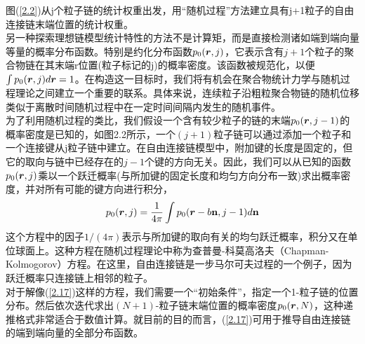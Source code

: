 图(\ref{2.2})从j个粒子链的统计权重出发，用“随机过程”方法建立具有j+1粒子的自由连接链末端位置的统计权重。\\

另一种探索理想链模型统计特性的方法不是计算矩，而是直接检测诸如端到端向量等量的概率分布函数。特别是约化分布函数$p_{0}(\bm{r},j)$，它表示含有$j+1$个粒子的聚合物链在其末端r位置(粒子标记的j)的概率密度。该函数被规范化，以便$\int p_0(\bm{r},j)d\bm{r}=1$。在构造这一目标时，我们将有机会在聚合物统计力学与随机过程理论之间建立一个重要的联系。具体来说，连续粒子沿粗粒聚合物链的随机位移类似于离散时间随机过程中在一定时间间隔内发生的随机事件。\\

为了利用随机过程的类比，我们假设一个含有较少粒子的链的末端$p_{0}(\bm{r},j-1)$的概率密度是已知的，如图2.2所示，一个$(j+1)$粒子链可以通过添加一个粒子和一个连接键从j粒子链中建立。在自由连接链模型中，附加键的长度是固定的，但它的取向与链中已经存在的$j−1$个键的方向无关。因此，我们可以从已知的函数$p_{0}(\bm{r},j)$乘以一个跃迁概率(与所加键的固定长度和均匀方向分布一致)求出概率密度，并对所有可能的键方向进行积分，\\
\begin{gather}
p_{0}(\bm{r},j)=\frac{1}{4 \pi} \int p_0(\bm{r}-b \mathbf{n},j-1)d\mathbf{n}
\label{2.17}
\end{gather}
这个方程中的因子$1/(4 \pi)$表示与所加键的取向有关的均匀跃迁概率，积分又在单位球面上。这种方程在随机过程理论中称为查普曼-科莫高洛夫（Chapman-Kolmogorov）方程。在这里，自由连接链是一步马尔可夫过程的一个例子，因为跃迁概率只连接链上相邻的粒子。\\

对于解像(\ref{2.17})这样的方程，我们需要一个“初始条件”，指定一个1-粒子链的位置分布。然后依次迭代求出$(N+1)$-粒子链末端位置的概率密度$p_{0}(\bm{r},N)$，这种递推格式非常适合于数值计算。就目前的目的而言，(\ref{2.17})可用于推导自由连接链的端到端向量的全部分布函数。\\

